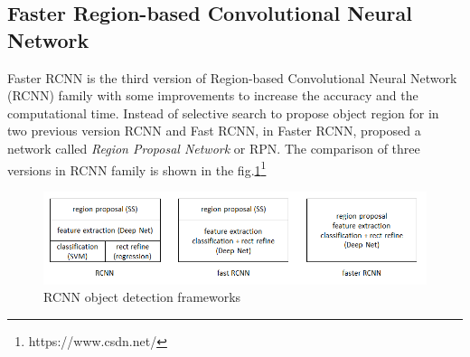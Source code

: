 \subsection{Faster Region-based Convolutional Neural Network}
\hspace{0.45cm}Faster \acrshort{RCNN} is the third version of Region-based Convolutional Neural Network (\acrshort{RCNN}) family with some
improvements to increase the accuracy and the computational time. Instead of selective search to propose object region
for in two previous version \acrshort{RCNN} and Fast \acrshort{RCNN}, in Faster \acrshort{RCNN}, \cite{FrRCNN} proposed a network called \textit{Region Proposal Network} or \acrshort{RPN}. The comparison of three versions in RCNN
family is shown in the fig.\ref{fig:rcnn_family}\footnote{https://www.csdn.net/}
\begin{figure}[h!]
    \centering
    \includegraphics[width=\textwidth]{Chapters/Fig/rcnn-family.png}
    \caption{\acrshort{RCNN} object detection frameworks}
    \label{fig:rcnn_family}
\end{figure}
